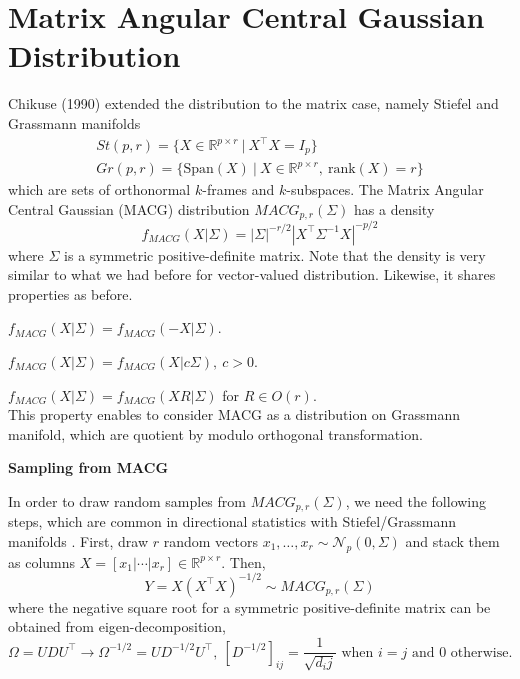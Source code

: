 \documentclass[fontsize=12pt]{article}
\begin{document}
\section{Matrix Angular Central Gaussian Distribution}

Chikuse (1990) \cite{chikuse_matrix_1990} extended the distribution to the matrix case, namely Stiefel and Grassmann manifolds
\begin{gather*}
	St(p,r) = \{X\in \mathbb{R}^{p\times r} ~\vert~ X^\top X = I_p\}\\
	Gr(p,r) = \{\text{Span}(X) ~\vert~ X \in \mathbb{R}^{p\times r},~\text{rank}(X)=r\}
\end{gather*}
which are sets of orthonormal $k$-frames and $k$-subspaces.  The Matrix Angular Central Gaussian (MACG) distribution $MACG_{p,r}(\Sigma)$ has a density
\begin{equation*}
	f_{MACG}(X\vert \Sigma) = |\Sigma|^{-r/2} |X^\top \Sigma^{-1} X|^{-p/2}
\end{equation*}
where $\Sigma$ is a symmetric positive-definite matrix. Note that the density is very similar to what we had before for vector-valued distribution. Likewise, it shares properties as before.
\begin{Properties}
	\item $f_{MACG}(X|\Sigma) = f_{MACG}(-X|\Sigma)$.
	\item $f_{MACG}(X|\Sigma) = f_{MACG}(X|c\Sigma),~c>0$.
	\item $f_{MACG}(X|\Sigma) = f_{MACG}(XR|\Sigma)$ for $R\in O(r)$.\\
	This property enables to consider MACG as a distribution on Grassmann manifold, which are quotient by modulo orthogonal transformation.
\end{Properties}

\noindent\textbf{Sampling from MACG}

In order to draw random samples from $MACG_{p,r}(\Sigma)$, we need the following steps, which are common in directional statistics with Stiefel/Grassmann manifolds \cite{mardia_directional_1999}. First, draw $r$ random vectors $x_1,\ldots,x_r \sim \mathcal{N}_p (0,\Sigma)$ and stack them as columns $X=[x_1|\cdots|x_r] \in \mathbb{R}^{p\times r}$. Then,
\begin{equation*}
	Y = X (X^\top X)^{-1/2} \sim MACG_{p,r}(\Sigma)
\end{equation*}
where the negative square root for a symmetric positive-definite matrix can be obtained from eigen-decomposition,
\begin{equation*}
	\Omega = UDU^\top \rightarrow \Omega^{-1/2} = UD^{-1/2} U^\top,~ \left[D^{-1/2}\right]_{ij} = \frac{1}{\sqrt{d_ij}} \textrm{ when } i = j \textrm{ and $0$ otherwise}.
\end{equation*}
\end{document}
